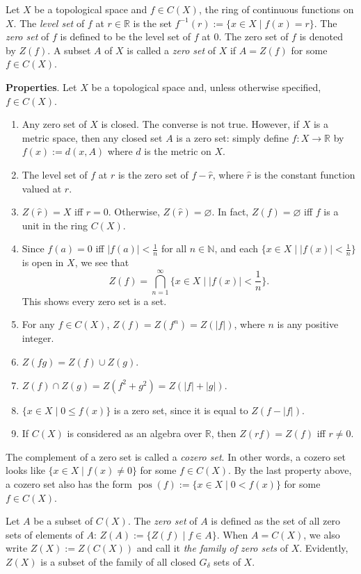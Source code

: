 \documentclass[12pt]{article}
\begin{document}
Let $X$ be a topological space and $f\in C(X)$, the ring of continuous functions on $X$.  The \emph{level set} of $f$ at $r\in \mathbb{R}$ is the set $f^{-1}(r):=\lbrace x\in X\mid f(x)=r\rbrace$.  The \emph{zero set} of $f$ is defined to be the level set of $f$ at $0$.  The zero set of $f$ is denoted by $Z(f)$.  A subset $A$ of $X$ is called a \emph{zero set} of $X$ if $A=Z(f)$ for some $f\in C(X)$.

\textbf{Properties}.  Let $X$ be a topological space and, unless otherwise specified, $f\in C(X)$.
\begin{enumerate}
\item Any zero set of $X$ is closed.  The converse is not true.  However, if $X$ is a metric space, then any closed set $A$ is a zero set: simply define $f:X\to \mathbb{R}$ by $f(x):=d(x,A)$ where $d$ is the metric on $X$.
\item The level set of $f$ at $r$ is the zero set of $f-\hat{r}$, where $\hat{r}$ is the constant function valued at $r$.
\item $Z(\hat{r})=X$ iff $r=0$.  Otherwise, $Z(\hat{r})=\varnothing$.  In fact, $Z(f)=\varnothing$ iff $f$ is a unit in the ring $C(X)$.
\item Since $f(a)=0$ iff $|f(a)|<\frac{1}{n}$ for all $n\in \mathbb{N}$, and each $\lbrace x\in X \mid |f(x)|<\frac{1}{n} \rbrace$ is open in $X$, we see that $$Z(f)=\bigcap_{n=1}^{\infty}\lbrace x\in X \mid |f(x)|<\frac{1}{n} \rbrace.$$ This shows every zero set is a  set.
\item For any $f\in C(X)$, $Z(f)=Z(f^n)=Z(|f|)$, where $n$ is any positive integer.
\item $Z(fg)=Z(f)\cup Z(g)$.
\item $Z(f)\cap Z(g)=Z(f^2+g^2)=Z(|f|+|g|)$.
\item $\lbrace x\in X\mid 0\le f(x)\rbrace$ is a zero set, since it is equal to $Z(f-|f|)$.
\item If $C(X)$ is considered as an algebra over $\mathbb{R}$, then $Z(rf)=Z(f)$ iff $r\ne 0$.
\end{enumerate}

The complement of a zero set is called a \emph{cozero set}.  In other words, a cozero set looks like $\lbrace x\in X\mid f(x)\ne 0\rbrace$ for some $f\in C(X)$.  By the last property above, a cozero set also has the form $\operatorname{pos}(f):=\lbrace x\in X\mid 0<f(x)\rbrace$ for some $f\in C(X)$.

Let $A$ be a subset of $C(X)$.  The \emph{zero set} of $A$ is defined as the set of all zero sets of elements of $A$: $Z(A):=\lbrace Z(f)\mid f\in A\rbrace$.  When $A=C(X)$, we also write $Z(X):=Z(C(X))$ and call it \emph{the family of zero sets} of $X$.  Evidently, $Z(X)$ is a subset of the family of all closed $G_{\delta}$ sets of $X$.  
\end{document}
